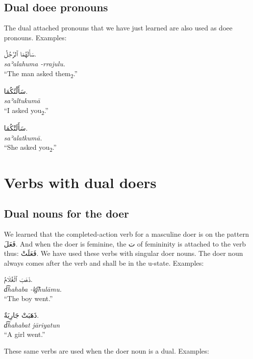 \documentclass[
  10pt,
]{book}
\begin{document}
\subsection{Dual doee pronouns}\label{dual-doee-pronouns}

The dual attached pronouns that we have just learned are also used as doee pronouns.
Examples:

\foreignlanguage{arabic}{سَأَلَهُمَا ٱلرَّجُلُ.}\\
\emph{saʾalahuma -rrajulu.}\\
\enquote{The man asked them\textsubscript{2}.}

\foreignlanguage{arabic}{سَأَلْتُکُمَا.}\\
\emph{saʾaltukumā}\\
\enquote{I asked you\textsubscript{2}.}

\foreignlanguage{arabic}{سَأَلَتْکُمَا.}\\
\emph{saʾalatkumā.}\\
\enquote{She asked you\textsubscript{2}.}

\section{Verbs with dual doers}\label{verbs-with-dual-doers}

\subsection{Dual nouns for the doer}\label{dual-nouns-for-the-doer}

We learned that the completed-action verb for a masculine doer is on the pattern \foreignlanguage{arabic}{فَعَلَ}. And when the doer is feminine, the \foreignlanguage{arabic}{ت} of femininity is attached to the verb thus: \foreignlanguage{arabic}{فَعَلَتْ}. We have used these verbs with singular doer nouns. The doer noun always comes after the verb and shall be in the u-state. Examples:

\foreignlanguage{arabic}{ذَهَبَ ٱلْغُلَامُ.}\\
\emph{d͡hahaba -lg͡hulāmu.}\\
\enquote{The boy went.}

\foreignlanguage{arabic}{ذَهَبَتْ جَارِيَةٌ.}\\
\emph{d͡hahabat jāriyatun}\\
\enquote{A girl went.}

These same verbs are used when the doer noun is a dual. Examples:
\end{document}
